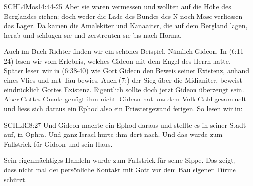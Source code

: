 \documentclass[12pt]{../../inc/mybib}
\newenvironment{block}[1][]{%
  \vspace{1.5em}%
  \noindent\textbf{#1}\par%
  \vspace{0.0em}%
}{%
  \vspace{1em}%
}
\begin{document}
\begin{bibelbox}{SCHL}{4Mos}{14:44-25}
        Aber sie waren vermessen und wollten auf die Höhe des Berglandes ziehen; doch weder die Lade des Bundes des \herr N noch Mose verliessen das Lager. Da kamen die Amalekiter und Kanaaiter, die auf dem Bergland lagen, herab und schlugen sie und zerstreuten sie bis nach Horma.
    \end{bibelbox} 
\begin{block}
    Auch im Buch Richter finden wir ein schönes Beispiel. Nämlich Gideon. In (6:11-24) lesen wir vom Erlebnis, welches Gideon mit dem Engel des Herrn hatte. Später lesen wir in (6:38-40) wie Gott Gideon den Beweis seiner Existenz, anhand eines Vlies und mit Tau bewies. Auch (7:) der Sieg über die Midianiter, beweist eindrücklich Gottes Existenz. Eigentlich sollte doch jetzt Gideon überzeugt sein. Aber Gottes Gnade genügt ihm nicht. Gideon hat aus dem Volk Gold gesammelt und liess sich daraus ein Ephod also ein Priestergewand ferigen. So lesen wir in:
    \begin{bibelbox}{SCHL}{Ri}{8:27}
        Und Gideon machte ein Ephod daraus und stellte es in seiner Stadt auf, in Ophra. Und ganz Israel hurte ihm dort nach. Und das wurde zum Fallstrick für Gideon und sein Haus.
    \end{bibelbox} 
    Sein eigenmächtiges Handeln wurde zum Fallstrick für seine Sippe. Das zeigt, dass nicht mal der persönliche Kontakt mit Gott vor dem Bau eigener Türme schützt.
\end{block}
\end{document}
